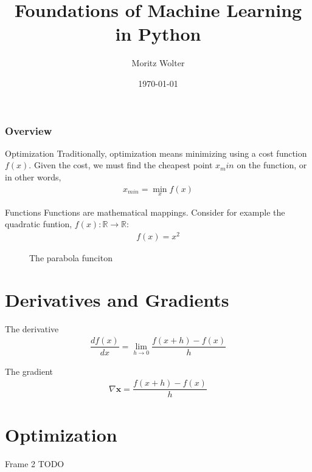\documentclass{beamer}
\title{Foundations of Machine Learning in Python}
\institute{High Performance Computing and Analytics Lab, Uni Bonn}
\author{Moritz Wolter}
\date{\today}
\begin{document}
    \maketitle

    \begin{frame}
    \frametitle{Overview} 
    \tableofcontents

    \end{frame}


    \begin{frame}{Optimization}
      Traditionally, optimization means minimizing using a cost function $f(x)$.
      Given the cost, we must find the cheapest point $x_min$ on the function,
      or in other words,
      \begin{align}
       x_{min} = \min_{x} f(x)        
      \end{align}
    \end{frame}

    \begin{frame}{Functions}
      Functions are mathematical mappings. Consider for example the quadratic funtion,
      $f(x): \mathbb{R} \rightarrow \mathbb{R}$:
      \begin{align}
        f(x) = x^2
      \end{align}

    \begin{figure}
      
      \caption{The parabola funciton}
    \end{figure}
    \end{frame}

    \section{Derivatives and Gradients}
    \begin{frame}{The derivative}
      \begin{align}
        \dfrac{d f(x)}{dx} = \lim_{h \rightarrow 0} \dfrac{f(x + h) - f(x)}{h}
      \end{align}

    \end{frame}

    \begin{frame}{The gradient}
      \begin{align}
        \nabla \mathbf{x} = \dfrac{f(x + h) - f(x)}{h}
      \end{align}

    \end{frame}




    \section{Optimization}
    \begin{frame}{Frame 2}
        TODO
    \end{frame}
\end{document}
